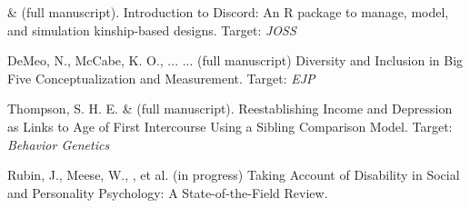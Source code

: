 
\item \jt \& \meb (full manuscript). Introduction to Discord: An R package to manage, model, and simulation kinship-based designs. Target: \textit{JOSS}

\item DeMeo, N., McCabe, K. O., ... \meb ... (full manuscript) Diversity and Inclusion in Big Five Conceptualization and Measurement.  Target: \textit{EJP}

\item Thompson, S. H. E. \noteA \& \meb (full manuscript). Reestablishing Income and Depression as Links to Age of First Intercourse Using a Sibling Comparison Model. Target: \textit{Behavior Genetics}

\item Rubin, J., Meese, W., \meb, et al. (in progress) Taking Account of Disability in Social and Personality Psychology: A State-of-the-Field Review.






%
%







